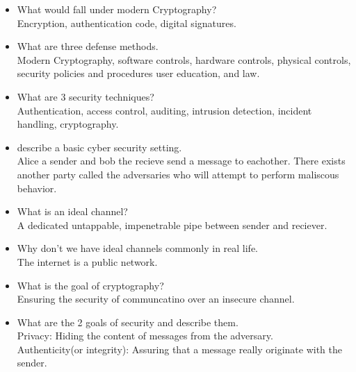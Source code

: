 


\begin{itemize}
    \item What would fall under modern Cryptography?\\
          Encryption, authentication code, digital signatures.\\

    \item What are three defense methods.\\
          Modern Cryptography, software controls, hardware controls, physical controls, security policies and procedures
          user education, and law.

    \item What are 3 security techniques?\\
          Authentication, access control, auditing, intrusion detection, incident handling, cryptography.\\

    \item describe a basic cyber security setting.\\
          Alice a sender and bob the recieve send a message to eachother. There exists another party called the adversaries who will
          attempt to perform maliscous behavior.\\

    \item What is an ideal channel?\\
          A dedicated untappable, impenetrable pipe between sender and reciever.\\

    \item Why don't we have ideal channels commonly in real life.\\
          The internet is a public network.\\

    \item What is the goal of cryptography?\\
          Ensuring the security of communcatino over an insecure channel.\\

    \item What are the 2 goals of security and describe them.\\
          Privacy: Hiding the content of messages from the adversary.\\
          Authenticity(or integrity): Assuring that a message really originate with the sender.\\


\end{itemize}
